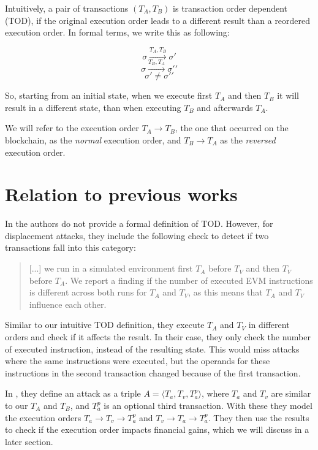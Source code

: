 \documentclass[draft,final]{vutinfth} %
\begin{document}
Intuitively, a pair of transactions $(T_A, T_B)$ is transaction order dependent (TOD), if the original execution order leads to a different result than a reordered execution order. In formal terms, we write this as following:

$$\sigma \xrightarrow{T_A, T_B} \sigma \prime$$
$$\sigma \xrightarrow{T_B, T_A} \sigma \prime \prime$$
$$\sigma \prime \neq \sigma \prime \prime$$

So, starting from an initial state, when we execute first $T_A$ and then $T_B$ it will result in a different state, than when executing $T_B$ and afterwards $T_A$.

We will refer to the execution order $T_A \rightarrow T_B$, the one that occurred on the blockchain, as the \emph{normal} execution order, and $T_B \rightarrow T_A$ as the \emph{reversed} execution order.

\section{Relation to previous works}

In \cite{torres_frontrunner_2021} the authors do not provide a formal definition of TOD. However, for displacement attacks, they include the following check to detect if two transactions fall into this category:

\begin{quote}
    [...] we run in a simulated environment first $T_A$ before $T_V$ and then $T_V$ before $T_A$. We report a finding if the number of executed EVM instructions is different across both runs for $T_A$ and $T_V$, as this means that $T_A$ and $T_V$ influence each other.
\end{quote}

Similar to our intuitive TOD definition, they execute $T_A$ and $T_V$ in different orders and check if it affects the result. In their case, they only check the number of executed instruction, instead of the resulting state. This would miss attacks where the same instructions were executed, but the operands for these instructions in the second transaction changed because of the first transaction.

In \cite{zhang_combatting_2023}, they define an attack as a triple $A = \langle T_a, T_v, T_a^p\rangle$, where $T_a$ and $T_v$ are similar to our $T_A$ and $T_B$, and $T_a^p$ is an optional third transaction. With these they model the execution orders $T_a \rightarrow T_v \rightarrow T_a^p$ and $T_v \rightarrow T_a \rightarrow T_a^p$. They then use the results to check if the execution order impacts financial gains, which we will discuss in a later section.
\end{document}
